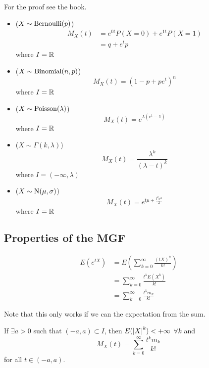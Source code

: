 \documentclass[12pt]{extarticle}
\newcommand{\Normal}{{\operatorfont N}}
\newcommand{\Poisson}{{\operatorfont Poisson}}
\begin{document}
For the proof see the book.
\begin{itemize}
    \item ($X \sim {\operatorfont Bernoulli}(p)$)
          \begin{align}
              M_X(t) & = e^{0t} P(X = 0) + e^{1t} P(X = 1) \\
                     & = q + e^t p
          \end{align}
          where $I = \mathbb{R}$
    \item ($X \sim {\operatorfont Binomial}(n, p)$)
          \begin{equation}
              M_X(t) = (1-p + p e^t)^n
          \end{equation}
          where $I = \mathbb{R}$
    \item ($X \sim \Poisson(\lambda)$)
          \begin{equation}
              M_X(t) = e^{\lambda (e^t -1)}
          \end{equation}
          where $I = \mathbb{R}$
    \item ($X \sim \Gamma(k, \lambda)$)
          \begin{equation}
              M_X(t) = \frac{\lambda^k}{(\lambda - t)^k}
          \end{equation}
          where $I = (-\infty, \lambda)$
    \item ($X \sim \Normal(\mu, \sigma)$)
          \begin{equation}
              M_X(t) = e^{t \mu + \frac{t^2 \sigma^2}{2}}
          \end{equation}
          where $I = \mathbb{R}$
\end{itemize}

\subsection{Properties of the MGF}

\begin{align}
    E(e^{tX}) & = E(\sum_{k = 0}^\infty \frac{(tX)^k}{k!})    \\
              & = \sum_{k = 0}^{\infty} \frac{t^k E(X^k)}{k!} \\
              & = \sum_{k = 0}^{\infty} \frac{t^k m_k}{k!}
\end{align}

Note that this only works if we can  the expectation from the sum.

\begin{theorem}
    \label{thm:mgf:mgf_expansion}
    If $\exists a > 0$ such that $(-a, a) \subset I$, then $E(\abs{X}^k) < +\infty$ $\forall k$ and
    \begin{equation}
        \label{eq:mgf:taylor}
        M_X(t) = \sum_{k = 0}^{\infty} \frac{t^k m_k}{k!}
    \end{equation}
    for all $t \in (-a, a)$.

\end{theorem}
\end{document}
